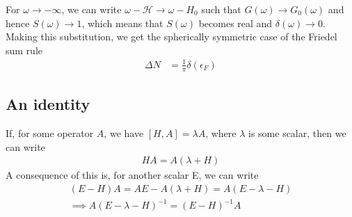\documentclass[twoside]{report}
\numberwithin{equation}{section}
\begin{document}
For \(\omega \to -\infty\), we can write \(\omega - \mathcal{H} \to \omega - H_0\) such that \(G(\omega) \to G_0(\omega)\) and hence \(S(\omega) \to 1\), which means that \(S(\omega)\) becomes real and \(\delta(\omega) \to 0\). Making this substitution, we get the spherically symmetric case of the Friedel sum rule
\begin{equation}\begin{aligned}
	\Delta N &= \frac{1}{\pi}\delta(\epsilon_F)
\end{aligned}\end{equation}

\subsection{An identity}
If, for some operator \(A\), we have \(\left[H,A\right] = \lambda A\), where \(\lambda\) is some scalar, then we can write
\begin{equation}\begin{aligned}
HA = A(\lambda+H)
\end{aligned}\end{equation}
A consequence of this is, for another scalar E, we can write
\begin{gather}
	(E - H)A = AE - A(\lambda+H) = A\left(E -\lambda -H\right) \\
\implies A(E - \lambda - H)^{-1} = (E-H)^{-1}A\label{identity}
\end{gather}
\end{document}
